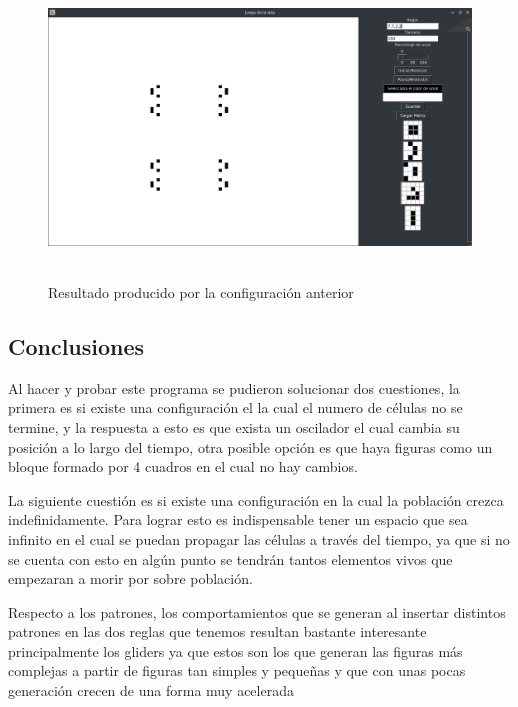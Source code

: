 \begin{figure}[H]
\begin{center}
 \includegraphics[width=12cm, height=8cm]{./img/final2.png}
 \caption{Resultado producido por la configuración anterior}
 \label{fig:final2}
\end{center}
\end{figure}

\subsection{Conclusiones}
Al hacer y probar este programa se pudieron solucionar dos cuestiones, la primera es si existe una configuración el la cual el numero de células no se termine, y la respuesta a esto es que exista un oscilador el cual cambia su posición a lo largo del tiempo, otra posible opción es que haya figuras como un bloque formado por 4 cuadros en el cual no hay cambios.

La siguiente cuestión es si existe una configuración en la cual la población crezca indefinidamente. Para lograr esto es indispensable tener un espacio que sea infinito en el cual se puedan propagar las células a través del tiempo, ya que si no se cuenta con esto en algún punto se tendrán tantos elementos vivos que empezaran a morir por sobre población.

Respecto a los patrones, los comportamientos que se generan al insertar distintos patrones en las dos reglas que tenemos resultan bastante interesante principalmente los gliders ya que estos son los que generan las figuras más complejas a partir de figuras tan simples y pequeñas y que con unas pocas generación crecen de una forma muy acelerada

